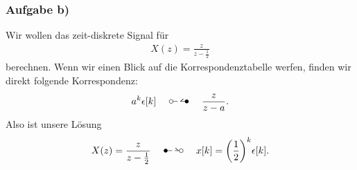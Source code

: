\documentclass[11pt,a4paper,DIV=12]{scrartcl}
\begin{document}
\subsubsection{Aufgabe b)}
Wir wollen das zeit-diskrete Signal für
\begin{align}
	X(z)=\frac{z}{z-\frac{1}{2}}
\end{align}
berechnen.
Wenn wir einen Blick auf die Korrespondenztabelle werfen, finden wir direkt folgende Korrespondenz:
\begin{align}
	\label{eq:GeometricProgression}
	a^k\epsilon[k]\quad\ztransf\quad\frac{z}{z-a}.
\end{align}
Also ist unsere Lösung
\begin{align}
	X(z)=\frac{z}{z-\frac{1}{2}}\quad\Ztransf\quad x[k]=\bigg (\frac{1}{2}\bigg)^k\epsilon[k].
\end{align}
\end{document}
